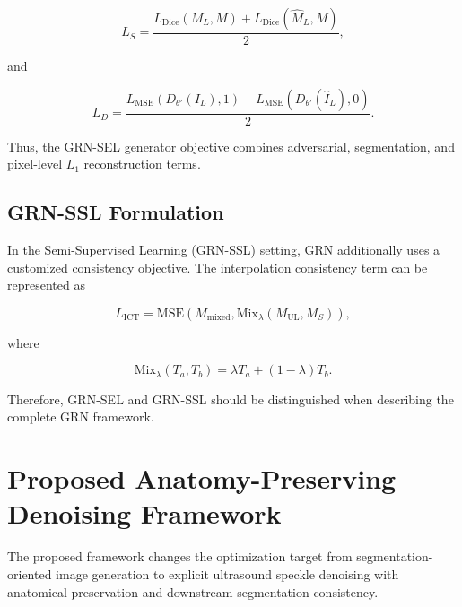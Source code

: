 \documentclass[conference]{IEEEtran}
\begin{document}
\begin{equation}
L_S
=
\frac{
L_{\mathrm{Dice}}(M_L,M)
+
L_{\mathrm{Dice}}(\hat M_L,M)
}{2},
\end{equation}

and

\begin{equation}
L_D
=
\frac{
L_{\mathrm{MSE}}
\left(
D_{\theta'}(I_L),1
\right)
+
L_{\mathrm{MSE}}
\left(
D_{\theta'}(\hat I_L),0
\right)
}{2}.
\end{equation}

Thus, the GRN-SEL generator objective combines adversarial,
segmentation, and pixel-level $L_1$ reconstruction terms.


\subsection{GRN-SSL Formulation}

In the Semi-Supervised Learning (GRN-SSL) setting, GRN additionally
uses a customized consistency objective. The interpolation consistency
term can be represented as

\begin{equation}
L_{\mathrm{ICT}}
=
\mathrm{MSE}
\left(
M_{\mathrm{mixed}},
\mathrm{Mix}_{\lambda}
(M_{\mathrm{UL}},M_S)
\right),
\end{equation}

where

\begin{equation}
\mathrm{Mix}_{\lambda}(T_a,T_b)
=
\lambda T_a+(1-\lambda)T_b.
\end{equation}

Therefore, GRN-SEL and GRN-SSL should be distinguished when describing
the complete GRN framework.



\section{Proposed Anatomy-Preserving Denoising Framework}

The proposed framework changes the optimization target from
segmentation-oriented image generation to explicit ultrasound
speckle denoising with anatomical preservation and downstream
segmentation consistency.
\end{document}
